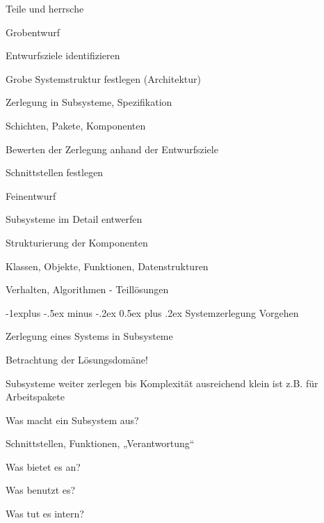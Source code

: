 \documentclass[a4paper]{article}
\makeatletter
\renewcommand{\subsection}{\@startsection{subsection}{2}{0mm}%
                                {-1explus -.5ex minus -.2ex}%
                                {0.5ex plus .2ex}%
                                {\normalfont\normalsize\bfseries}}
\makeatother
\begin{document}
\begin{multicols}{3}
  Teile und herrsche
  \begin{itemize*}
    \item Grobentwurf
          \begin{itemize*}
            \item Entwurfsziele identifizieren
            \item Grobe Systemstruktur festlegen (Architektur)
            \item Zerlegung in Subsysteme, Spezifikation
                  \begin{itemize*}
                    \item Schichten, Pakete, Komponenten
                  \end{itemize*}
            \item Bewerten der Zerlegung anhand der Entwurfsziele
            \item Schnittstellen festlegen
          \end{itemize*}
    \item Feinentwurf
          \begin{itemize*}
            \item Subsysteme im Detail entwerfen
                  \begin{itemize*}
                    \item Strukturierung der Komponenten
                    \item Klassen, Objekte, Funktionen, Datenstrukturen
                    \item Verhalten, Algorithmen - Teillösungen
                  \end{itemize*}
          \end{itemize*}
  \end{itemize*}


  \subsection{Systemzerlegung}
  Vorgehen
  \begin{itemize*}
    \item Zerlegung eines Systems in Subsysteme
    \item Betrachtung der Lösungsdomäne!
    \item Subsysteme weiter zerlegen bis Komplexität ausreichend klein ist z.B. für Arbeitspakete
  \end{itemize*}

  Was macht ein Subsystem aus?
  \begin{itemize*}
    \item Schnittstellen, Funktionen, „Verantwortung“
    \item Was bietet es an?
    \item Was benutzt es?
    \item Was tut es intern?
  \end{itemize*}


\end{multicols}
\end{document}
